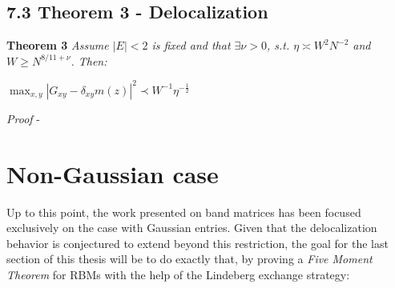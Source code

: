 \documentclass[11pt]{article}
\newenvironment{boxtheorem}[1]
  {\begin{mdframed}\noindent\textbf{#1}\itshape\space}
  {\end{mdframed}}
\begin{document}
\subsection*{7.3 Theorem 3 - Delocalization}
\label{proof-deloc}
\begin{boxtheorem}{Theorem 3}
\noindent Assume $|E|<2$ is fixed and that $\exists \nu>0$, s.t. $\eta \asymp W^2 N^{-2}$ and $W\geq N^{8/11+\nu}$. Then:
\begin{center}$\max_{x, y}|G_{xy} - \delta_{xy}m(z)|^2\prec W^{-1}\eta^{-\frac{1}{2}}$\end{center}
\end{boxtheorem}
\textit{Proof} - 


\newpage

\section{Non-Gaussian case}
\label{sec:non-gaussian}
Up to this point, the work presented on band matrices has been focused exclusively on the case with Gaussian entries. Given that the delocalization behavior is conjectured to extend beyond this restriction, the goal for the last section of this thesis will be to do exactly that, by proving a \textit{Five Moment Theorem} for RBMs with the help of the Lindeberg exchange strategy:
\end{document}
